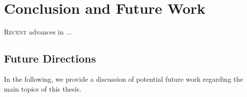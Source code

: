 \chapter{Conclusion and Future Work}
\label{chap:conclusion}

\vspace*{-2.2em}
\minitoc
\vspace*{0.8em}

\lettrine[lines=3]{R}{ecent} advances in  ...

\section{Future Directions}

In the following, we provide a discussion of potential future work regarding the main topics of this thesis.

